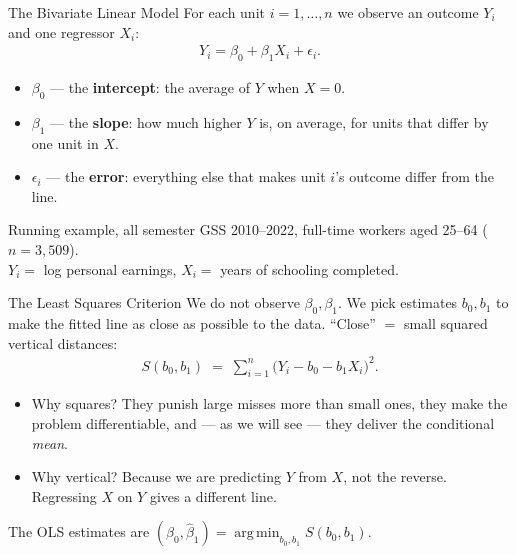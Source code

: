 \documentclass[aspectratio=169,11pt,xcolor=dvipsnames]{beamer}
\DeclareMathOperator*{\argmin}{arg\,min}
\begin{document}
\begin{frame}{The Bivariate Linear Model}
For each unit $i = 1,\dots,n$ we observe an outcome $Y_i$ and one regressor $X_i$:
\begin{align*}
  Y_i = \beta_0 + \beta_1 X_i + \epsilon_i .
\end{align*}
\begin{itemize}\itemsep4pt
  \item $\beta_0$ --- the \textbf{intercept}: the average of $Y$ when $X = 0$.
  \item $\beta_1$ --- the \textbf{slope}: how much higher $Y$ is, on average, for
        units that differ by one unit in $X$.
  \item $\epsilon_i$ --- the \textbf{error}: everything else that makes unit $i$'s
        outcome differ from the line.
\end{itemize}
\vskip6pt
\begin{block}{Running example, all semester}
GSS 2010--2022, full-time workers aged 25--64 ($n = 3{,}509$). \\
$Y_i = $ log personal earnings, $X_i = $ years of schooling completed.
\end{block}
\end{frame}

\begin{frame}{The Least Squares Criterion}
We do not observe $\beta_0,\beta_1$. We pick estimates $b_0, b_1$ to make the
fitted line as close as possible to the data. ``Close'' $=$ small squared
vertical distances:
\begin{align*}
  S(b_0, b_1) \;=\; \sum_{i=1}^{n}\big(Y_i - b_0 - b_1 X_i\big)^2 .
\end{align*}
\pause
\begin{itemize}\itemsep4pt
  \item Why squares? They punish large misses more than small ones, they make the
        problem differentiable, and --- as we will see --- they deliver the
        conditional \emph{mean}.
  \item Why vertical? Because we are predicting $Y$ from $X$, not the reverse.
        Regressing $X$ on $Y$ gives a different line.
\end{itemize}
\vskip4pt
The OLS estimates are $(\hat\beta_0, \hat\beta_1) = \argmin_{b_0,b_1} S(b_0,b_1)$.
\end{frame}
\end{document}
